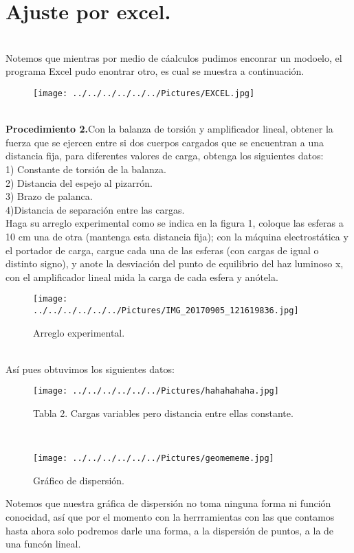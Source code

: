 \documentclass[11pt,a4paper]{article}
\begin{document}
\section*{Ajuste por excel.}\\
Notemos que mientras por medio de c\'{a}alculos pudimos enconrar un modoelo, el programa Excel pudo enontrar otro, es cual se muestra a continuaci\'{o}n.
\\
\begin{figure}[hbtp]
 \centering
\texttt{[image: ../../../../../../Pictures/EXCEL.jpg]} 
\end{figure}
\\
\textbf{Procedimiento 2.}Con la balanza de torsi\'{o}n y amplificador lineal, obtener la fuerza que se ejercen entre si dos cuerpos cargados que se encuentran a una distancia fija, para diferentes valores de carga, obtenga los siguientes datos:\\
1) Constante de torsi\'{o}n de la balanza.\\
2) Distancia del espejo al pizarr\'{o}n.\\
3) Brazo de palanca.\\
4)Distancia de separaci\'{o}n entre las cargas.\\
Haga su arreglo experimental como se indica en la figura 1, coloque las esferas a 10 cm una de otra (mantenga esta distancia fija); con la m\'{a}quina electrost\'{a}tica y el portador de carga, cargue cada una de las esferas (con cargas de igual o distinto signo), y anote la desviaci\'{o}n del punto de equilibrio del haz luminoso x, con el amplificador lineal mida la carga de cada esfera y an\'{o}tela.
\begin{figure}[hbtp]
\caption{Arreglo experimental.}
\centering
\texttt{[image: ../../../../../../Pictures/IMG\_20170905\_121619836.jpg]}
\end{figure}
\\
As\'{i} pues obtuvimos los siguientes datos:\\
\begin{figure}[hbtp]
\caption{Tabla 2. Cargas variables pero distancia entre ellas constante.}
\centering
\texttt{[image: ../../../../../../Pictures/hahahahaha.jpg]} 
\end{figure}
\\
\begin{figure}[hbtp]
\centering
\texttt{[image: ../../../../../../Pictures/geomememe.jpg]}
\caption{Gr\'{a}fico de dispersi\'{o}n.}
\end{figure}
Notemos que nuestra gr\'{a}fica de dispersi\'{o}n no toma ninguna forma ni funci\'{o}n conocidad, as\'{i} que por el momento con la herrramientas con las que contamos hasta ahora solo podremos darle una forma, a la dispersi\'{o}n de puntos, a la de una func\'{o}n lineal.
\end{document}
